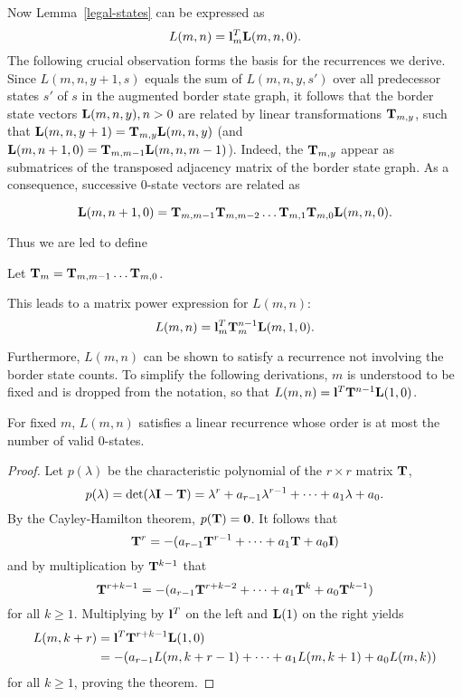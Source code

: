 \documentclass{article}
\begin{document}
Now Lemma~\ref{legal-states} can be expressed as
\[L(m,n) = \mathbf{l}_m^T \mathbf{L}(m,n,0).\]
The following crucial observation forms the basis for the recurrences
we derive.
Since $L(m,n,y+1,s)$ equals the sum of
$L(m,n,y,s')$ over all predecessor states $s'$ of $s$ in the augmented border
state graph, it follows that
the border state vectors $\mathbf{L}(m,n,y), n>0$ are related by linear
transformations $\mathbf{T}_{m,y}$, such that
$\mathbf{L}(m,n,y+1) = \mathbf{T}_{m,y} \mathbf{L}(m,n,y)$
(and $\mathbf{L}(m,n+1,0) = \mathbf{T}_{m,m-1} \mathbf{L}(m,n,m-1)$).
Indeed, the $\mathbf{T}_{m,y}$
appear as submatrices of the transposed adjacency matrix of
the border state graph.
As a consequence, successive $0$-state vectors are related as

\[ \mathbf{L}(m,n+1,0) = \mathbf{T}_{m,m-1} \mathbf{T}_{m,m-2} \dots
  \mathbf{T}_{m,1} \mathbf{T}_{m,0} \mathbf{L}(m,n,0). \]

Thus we are led to define

\begin{defin}
Let $\mathbf{T}_m = \mathbf{T}_{m,m-1} \dots \mathbf{T}_{m,0}$.
\end{defin}

This leads to a matrix power expression for $L(m,n)$:
\[ L(m,n) = \mathbf{l}_m^T \mathbf{T}_m^{n-1} \mathbf{L}(m,1,0). \]

Furthermore, $L(m,n)$ can be shown to satisfy a recurrence not
involving the border state counts. To simplify the following
derivations, $m$ is understood to be fixed and is dropped from the
notation, so that $L(m,n) = \mathbf{l}^T \mathbf{T}^{n-1} \mathbf{L}(1,0)$.

\begin{theorem}
\label{recurrence}
  For fixed $m$, $L(m,n)$ satisfies a linear recurrence
  whose order is at most the number of valid $0$-states.
\end{theorem} 

\begin{proof}
  Let $p(\lambda)$ be the characteristic polynomial of the $r \times r$
  matrix $\mathbf{T}$,
  \[
    p(\lambda) = \det (\lambda \mathbf{I} - \mathbf{T}) =
    \lambda^r + a_{r-1} \lambda^{r-1} + \dots + a_1 \lambda + a_0.
  \]
  By the Cayley-Hamilton theorem, $p(\mathbf{T}) = \mathbf{0}$. It
  follows that
  \[
    \mathbf{T}^r = -(a_{r-1}\mathbf{T}^{r-1} + \dots + a_1
    \mathbf{T} + a_0 \mathbf{I})
  \]
  and by multiplication by $\mathbf{T}^{k-1}$ that
  \[
    \mathbf{T}^{r+k-1} = -(a_{r-1}\mathbf{T}^{r+k-2} + \dots +
    a_1 \mathbf{T}^{k} + a_0 \mathbf{T}^{k-1})
  \]
  for all $k \geq 1$. Multiplying by
  $\mathbf{l}^T$ on the left and $\mathbf{L}(1)$ on the right yields
  \[
    \begin{split}
      L(m,k+r) &= \mathbf{l}^T \mathbf{T}^{r+k-1} \mathbf{L}(1,0) \\
      &= -(a_{r-1} L(m,k+r-1) + \dots + a_1 L(m,k+1) + a_0 L(m,k))
    \end{split}
  \]
  for all $k \geq 1$, proving the theorem.
\end{proof}
\end{document}
